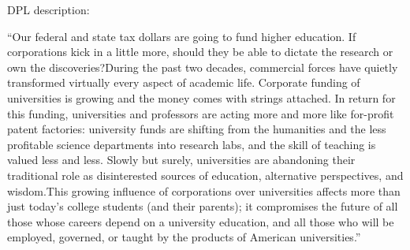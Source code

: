 DPL description:

``Our federal and state tax dollars are going to fund higher education.
If corporations kick in a little more, should they be able to dictate
the research or own the discoveries?During the past two decades,
commercial forces have quietly transformed virtually every aspect of
academic life. Corporate funding of universities is growing and the
money comes with strings attached. In return for this funding,
universities and professors are acting more and more like for-profit
patent factories: university funds are shifting from the humanities and
the less profitable science departments into research labs, and the
skill of teaching is valued less and less. Slowly but surely,
universities are abandoning their traditional role as disinterested
sources of education, alternative perspectives, and wisdom.This growing
influence of corporations over universities affects more than just
today's college students (and their parents); it compromises the future
of all those whose careers depend on a university education, and all
those who will be employed, governed, or taught by the products of
American universities.''
